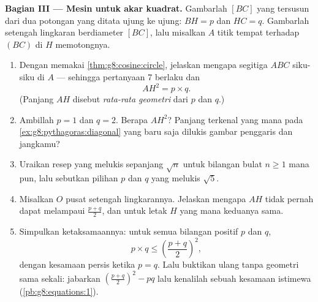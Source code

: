 \begin{problem}[{Soal akhir pekan --- garis tinggi segitiga
siku-siku: $AB^2 = BH \times BC$, $AH^2 = BH \times HC$, bukti kedua
Pythagoras, dan mesin untuk melukis akar kuadrat}]
\medskip
\noindent\textbf{Bagian III --- Mesin untuk akar kuadrat.}
Gambarlah  $[BC]$ yang tersusun dari dua potongan yang
ditata ujung ke ujung: $BH = p$ dan $HC = q$. Gambarlah setengah
lingkaran berdiameter $[BC]$, lalu misalkan $A$ titik tempat  terhadap $(BC)$ di $H$ memotongnya.
\begin{enumerate}[resume]
  \item Dengan memakai \cref{thm:g8:cosine:circle}, jelaskan mengapa
        segitiga $ABC$ siku-siku di $A$ --- sehingga pertanyaan 7
        berlaku dan
        \[
        AH^2 = p \times q .
        \]
        (Panjang $AH$ disebut \emph{rata-rata
        geometri} dari $p$ dan $q$.)
  \item Ambillah $p = 1$ dan $q = 2$. Berapa $AH^2$? Panjang terkenal
        yang mana pada \cref{ex:g8:pythagoras:diagonal} yang baru
        saja dilukis gambar penggaris dan jangkamu?
  \item Uraikan resep yang melukis  sepanjang
        $\sqrt n$ untuk bilangan bulat $n \geq 1$ mana pun, lalu
        sebutkan pilihan $p$ dan $q$ yang melukis $\sqrt 5$.
  \item Misalkan $O$ pusat setengah lingkarannya. Jelaskan mengapa
        $AH$ tidak pernah dapat melampaui 
        $\frac{p + q}{2}$, dan untuk letak $H$ yang mana keduanya
        sama.
  \item Simpulkan ketaksamaannya: untuk semua bilangan positif $p$
        dan $q$,
        \[
        p \times q \leq \left(\frac{p + q}{2}\right)^2,
        \]
        dengan kesamaan persis ketika $p = q$. Lalu buktikan ulang
        tanpa geometri sama sekali: jabarkan
        $\left(\frac{p+q}{2}\right)^2 - p q$ lalu kenalilah sebuah
        kesamaan istimewa (\cref{pb:g8:equations:1}).

\end{enumerate}
\end{problem}
